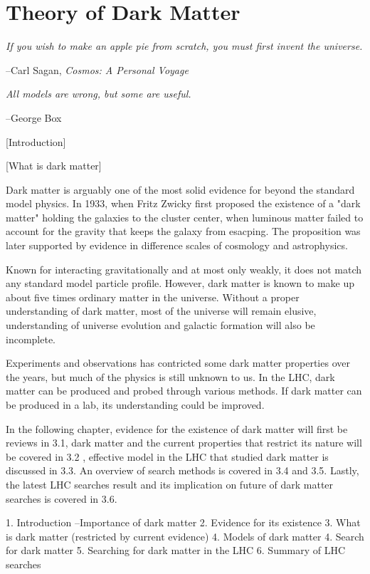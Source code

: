 \chapter{Theory of Dark Matter}

	

\epigraph{\textit{If you wish to make an apple pie from scratch, you must first invent the universe.}}{--Carl Sagan, \textit{Cosmos: A Personal Voyage}}
\epigraph{\textit{All models are wrong, but some are useful.}}{--George Box}


[Introduction]

[What is dark matter]

Dark matter is arguably one of the most solid evidence for beyond the standard model physics. In 1933, when Fritz Zwicky first proposed the existence of a "dark matter" holding the galaxies to the cluster center, when luminous matter failed to account for the gravity that keeps the galaxy from esacping.  The proposition was later supported by evidence in difference scales of cosmology and astrophysics. 

Known for interacting gravitationally and at most only weakly, it does not match any standard model particle profile. However, dark matter is known to make up about five times ordinary matter in the universe. Without a proper understanding of dark matter, most of the universe will remain elusive, understanding of universe evolution and galactic formation will also be incomplete.

Experiments and observations has contricted some dark matter properties over the years, but much of the physics is still unknown to us. In the LHC, dark matter can be produced and probed through various methods. If dark matter can be produced in a lab, its understanding could be improved. 

In the following chapter, evidence for the existence of dark matter will first be reviews in 3.1, dark matter and the current properties that restrict its nature will be covered in 3.2 , effective model in the LHC that studied dark matter is discussed in 3.3. An overview of search methods is covered in 3.4 and 3.5. Lastly, the latest LHC searches result and its implication on future of dark matter searches is covered in 3.6. 

1. Introduction --Importance of dark matter 
2. Evidence for its existence 
3. What is dark matter (restricted by current evidence) 
4. Models of dark matter
4. Search for dark matter 
5. Searching for dark matter in the LHC 
6. Summary of LHC searches


